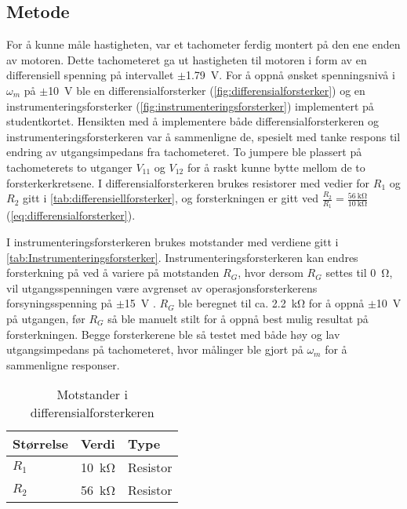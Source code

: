 \subsection{Metode}


For å kunne måle hastigheten, var et tachometer ferdig montert på den ene enden av motoren. Dette tachometeret ga ut hastigheten til motoren i form av en differensiell spenning på intervallet $\pm${\SI{1.79}{\volt}}. For å oppnå ønsket spenningsnivå i $\omega_m$ på $\pm${\SI{10}{\volt}} ble en differensialforsterker (\autoref{fig:differensialforsterker}) og en instrumenteringsforsterker (\autoref{fig:instrumenteringsforsterker}) implementert på studentkortet.
Hensikten med å implementere både differensialforsterkeren og instrumenteringsforsterkeren var å sammenligne de, spesielt med tanke respons til endring av utgangsimpedans fra tachometeret.
To jumpere ble plassert på tachometerets to utganger $V_{11}$ og $V_{12}$ for å raskt kunne bytte mellom de to forsterkerkretsene. I differensialforsterkeren brukes resistorer med vedier for $R_1$ og $R_2$ gitt i \autoref{tab:differensiellforsterker}, og forsterkningen er gitt ved $\frac{R_2}{R_1} = \frac{\SI{56}{\kilo\ohm}}{\SI{10}{\kilo\ohm}}$(\autoref{eq:differensialforsterker}).

I instrumenteringsforsterkeren brukes motstander med verdiene gitt i \autoref{tab:Instrumenteringsforsterker}. Instrumenteringsforsterkeren kan endres forsterkning på ved å variere på motstanden $R_G$, hvor dersom $R_G$ settes til {\SI{0}{\ohm}}, vil utgangsspenningen være avgrenset av operasjonsforsterkerens forsyningsspenning på $\pm${\SI{15}{\volt}} . $R_G$ ble beregnet til ca. {\SI{2.2}{\kilo\ohm}} for å oppnå $\pm${\SI{10}{\volt}} på utgangen, før $R_G$ så ble manuelt stilt for å oppnå best mulig resultat på forsterkningen. Begge forsterkerene ble så testet med både høy og lav utgangsimpedans på tachometeret, hvor målinger ble gjort på $\omega_m$ for å sammenligne responser.

\begin{table}[h]
	\centering
    \caption{Motstander i differensialforsterkeren}
	\begin{tabular}{lll}
		\toprule
		Størrelse & Verdi & Type \\
		\midrule
        $R_1$ & \SI{10}{\kilo\ohm} & Resistor \\
        $R_2$ & \SI{56}{\kilo\ohm} & Resistor\\
		\bottomrule
	\end{tabular}
\label{tab:differensiellforsterker}
\end{table}

